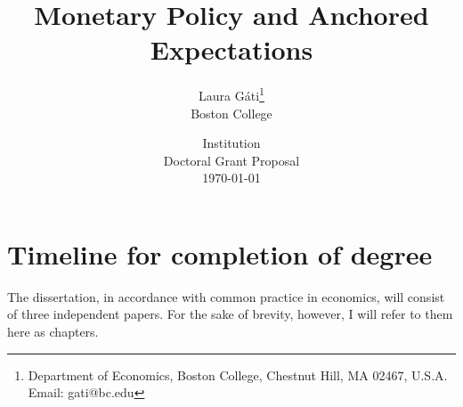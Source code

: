 \documentclass[11pt]{article}
\renewcommand{\[}{\begin{equation}}
\renewcommand{\]}{\end{equation}}
\begin{document}
\linespread{1.0}

\title{Monetary Policy and Anchored Expectations}
\author{Laura G\'ati\thanks{%
Department of Economics, Boston College, Chestnut Hill, MA 02467, U.S.A. Email: gati@bc.edu} \\
 Boston College \\
}
\date{Institution \\
 Doctoral Grant Proposal \\
 \today}
\maketitle




\vspace{0.2cm}



\section*{Timeline for completion of degree}
The dissertation, in accordance with common practice in economics, will consist of three independent papers. For the sake of brevity, however, I will refer to them here as chapters. 
\end{document}
